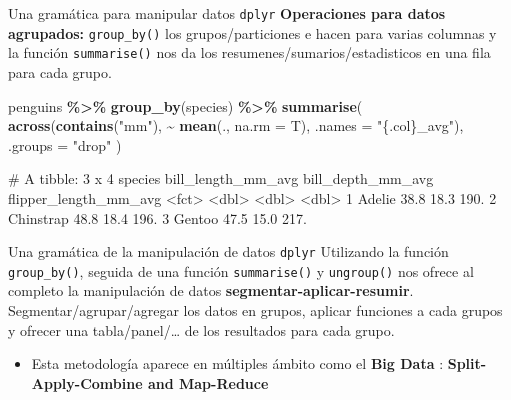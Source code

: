 \documentclass[
  ignorenonframetext,
  aspectratio=169]{beamer}
\newenvironment{Shaded}{\begin{snugshade}}{\end{snugshade}}
\newcommand{\AttributeTok}[1]{\textcolor[rgb]{0.13,0.29,0.53}{#1}}
\newcommand{\FunctionTok}[1]{\textcolor[rgb]{0.13,0.29,0.53}{\textbf{#1}}}
\newcommand{\NormalTok}[1]{#1}
\newcommand{\SpecialCharTok}[1]{\textcolor[rgb]{0.81,0.36,0.00}{\textbf{#1}}}
\newcommand{\StringTok}[1]{\textcolor[rgb]{0.31,0.60,0.02}{#1}}
\providecommand{\tightlist}{%
  \setlength{\itemsep}{0pt}\setlength{\parskip}{0pt}}
\let\oldverbatim\verbatim
\let\endoldverbatim\endverbatim
\renewenvironment{verbatim}{\tiny\oldverbatim}{\endoldverbatim}
\begin{document}
\begin{frame}[fragile]{Una gramática para manipular datos
\texttt{dplyr}}
\label{una-gramuxe1tica-para-manipular-datos-dplyr-6}
\textbf{Operaciones para datos agrupados:} \texttt{group\_by()} los
grupos/particiones e hacen para varias columnas y la función
\texttt{summarise()} nos da los resumenes/sumarios/estadisticos en una
fila para cada grupo.

\begin{Shaded}
\begin{Highlighting}[]
\NormalTok{penguins }\SpecialCharTok{\%\textgreater{}\%}
  \FunctionTok{group\_by}\NormalTok{(species) }\SpecialCharTok{\%\textgreater{}\%}
  \FunctionTok{summarise}\NormalTok{(}
    \FunctionTok{across}\NormalTok{(}\FunctionTok{contains}\NormalTok{(}\StringTok{"mm"}\NormalTok{), }\SpecialCharTok{\textasciitilde{}} \FunctionTok{mean}\NormalTok{(., }\AttributeTok{na.rm =}\NormalTok{ T), }\AttributeTok{.names =} \StringTok{"\{.col\}\_avg"}\NormalTok{),}
    \AttributeTok{.groups =} \StringTok{"drop"}
\NormalTok{  )}
\end{Highlighting}
\end{Shaded}

\begin{verbatim}
# A tibble: 3 x 4
  species   bill_length_mm_avg bill_depth_mm_avg flipper_length_mm_avg
  <fct>                  <dbl>             <dbl>                 <dbl>
1 Adelie                  38.8              18.3                  190.
2 Chinstrap               48.8              18.4                  196.
3 Gentoo                  47.5              15.0                  217.
\end{verbatim}
\end{frame}

\begin{frame}[fragile]{Una gramática de la manipulación de datos
\texttt{dplyr}}
\label{una-gramuxe1tica-de-la-manipulaciuxf3n-de-datos-dplyr-30}
Utilizando la función \texttt{group\_by()}, seguida de una función
\texttt{summarise()} y \texttt{ungroup()} nos ofrece al completo la
manipulación de datos \textbf{segmentar-aplicar-resumir}.
Segmentar/agrupar/agregar los datos en grupos, aplicar funciones a cada
grupos y ofrecer una tabla/panel/\ldots{} de los resultados para cada
grupo.

\begin{itemize}
\tightlist
\item
  Esta metodología aparece en múltiples ámbito como el \textbf{Big Data}
  : \textbf{Split-Apply-Combine and Map-Reduce}
\end{itemize}
\end{frame}
\end{document}
